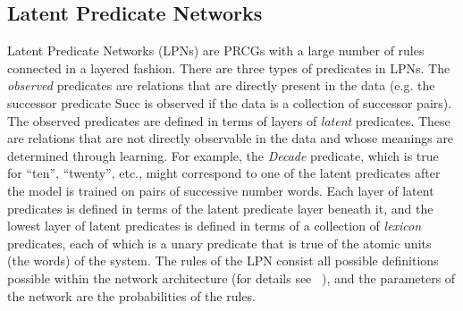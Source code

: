 \documentclass[10pt,letterpaper]{article}
\begin{document}


\subsection{Latent Predicate Networks}


Latent Predicate Networks (LPNs) are PRCGs with a large number of
rules connected in a layered fashion. There are three types of
predicates in LPNs. The \emph{observed} predicates are relations that
are directly present in the data (e.g. the successor predicate Succ is
observed if the data is a collection of successor pairs). The observed
predicates are defined in terms of layers of \emph{latent}
predicates. These are relations that are not directly observable in
the data and whose meanings are determined through learning. For
example, the \emph{Decade} predicate, which is true for ``ten'',
``twenty'', etc., might correspond to one of the latent predicates
after the model is trained on pairs of successive number words. Each
layer of latent predicates is defined in terms of the latent predicate
layer beneath it, and the lowest layer of latent predicates is defined
in terms of a collection of \emph{lexicon} predicates, each of which
is a unary predicate that is true of the atomic units (the words) of
the system. The rules of the LPN consist all possible definitions
possible within the network architecture (for details see
~\cite{DecRulTen2015}), and the parameters of the network are the
probabilities of the rules.
\end{document}
